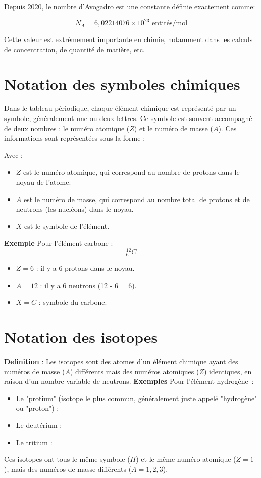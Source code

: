 \documentclass{article}
\begin{document}
Depuis 2020, le nombre d'Avogadro est une constante définie exactement comme:

\[
N_A = 6,022 140 76 \times 10^{23} \text{ entités/mol}
\]

Cette valeur est extrêmement importante en chimie, notamment dans les calculs de concentration,
de quantité de matière, etc.

\section{Notation des symboles chimiques}

Dans le tableau périodique, chaque élément chimique est représenté par un symbole, généralement
une ou deux lettres. Ce symbole est souvent accompagné de deux nombres : le numéro atomique 
(\(Z\)) et le numéro de masse (\(A\)). Ces informations sont représentées sous la forme :


Avec :
\begin{itemize}
    \item \(Z\) est le numéro atomique, qui correspond au nombre de protons dans le noyau de l'atome.
    \item \(A\) est le numéro de masse, qui correspond au nombre total de protons et de neutrons (les nucléons) dans le noyau.
    \item \(X\) est le symbole de l'élément.
\end{itemize}
\smallskip
\textbf{Exemple}
Pour l'élément carbone :
\[
^{12}_{6}C
\]
\begin{itemize}
    \item \(Z = 6\) : il y a 6 protons dans le noyau.
    \item \(A = 12\) : il y a 6 neutrons (12 - 6 = 6).
    \item \(X = C\) : symbole du carbone.
\end{itemize}

\section{Notation des isotopes}

\textbf{Definition} : Les isotopes sont des atomes d'un élément chimique ayant des numéros de masse (\(A\)) différents
mais des numéros atomiques (\(Z\)) identiques, en raison d'un nombre variable de neutrons.
\smallskip
\textbf{Exemples}
Pour l'élément hydrogène~:
\begin{itemize}
    \item Le "protium" (isotope le plus commun, généralement juste appelé "hydrogène" ou "proton") : 
    \item Le deutérium : 
    \item Le tritium : 
\end{itemize}
\smallskip
Ces isotopes ont tous le même symbole (\(H\)) et le même numéro atomique (\(Z = 1\)),
mais des numéros de masse différents (\(A = 1, 2, 3\)).
\end{document}
